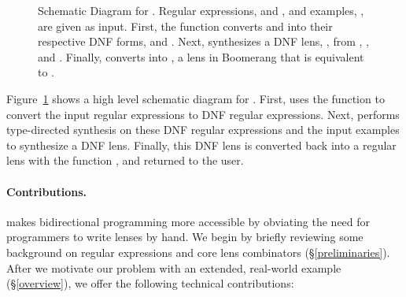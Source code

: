 \documentclass[acmsmall]{acmart}
\begin{document}
\begin{figure}
\begin{tikzpicture}[auto,node distance=1.5cm]
  \end{tikzpicture}
  \caption{Schematic Diagram for \Optician{}.  Regular expressions, \Regex{} and
    \RegexAlt{}, and examples, \Examples{}, are given as input.
    First, the function \ToDNFRegex{} converts \Regex{} and \RegexAlt{} into
    their respective DNF forms, \DNFRegex{} and \DNFRegexAlt{}.
    Next, \SynthDNFLens{} synthesizes a DNF lens, \DNFLens{}, from \Regex{},
    \RegexAlt{}, and \Examples{}.
    Finally, \ToLens{} converts \DNFLens{} into \Lens{}, a lens in Boomerang
    that is equivalent to \DNFLens{}.}
  \label{fig:schematic-diagram-synthesis}
\end{figure}

Figure~\ref{fig:schematic-diagram-synthesis} shows a high level
schematic diagram for \Optician{}.
First, \Optician{} uses the function \ToDNFRegex{} to convert the input
regular expressions to DNF regular expressions.  Next,
\SynthDNFLens{} performs type-directed synthesis on these DNF regular
expressions and the input examples to synthesize a DNF lens.  Finally, this DNF lens is
converted back into a regular lens with the function \ToLens{}, and returned to the user.

\paragraph*{Contributions.}  \Optician{} makes
bidirectional programming more accessible by obviating the need for
programmers to write lenses by hand.
We begin by briefly reviewing some background on regular expressions and core
lens combinators (\S\ref{preliminaries}).
After we motivate our problem
with an extended, real-world example (\S\ref{overview}),
we offer the following technical contributions:
\end{document}
